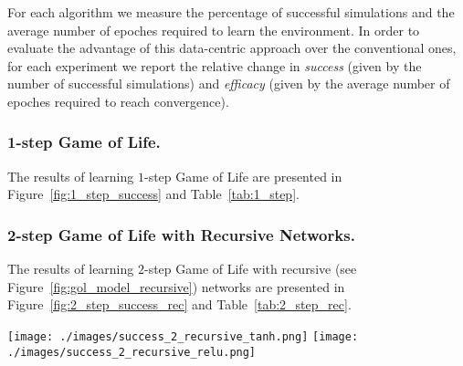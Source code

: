 \documentclass[letterpaper]{article} %
\begin{document}
For each algorithm we measure the percentage of successful simulations and the average number of epoches required to learn the environment.
In order to evaluate the advantage of this data-centric approach over the conventional ones, for each experiment we report the relative change in \textit{success} (given by the number of successful simulations) and \textit{efficacy} (given by the average number of epoches required to reach convergence).


\subsubsection{1-step Game of Life.}
The results of learning $1$-step Game of Life are presented in Figure~\ref{fig:1_step_success} and Table~\ref{tab:1_step}.


\subsubsection{2-step Game of Life with Recursive Networks.}
The results of learning $2$-step Game of Life with recursive (see Figure~\ref{fig:gol_model_recursive}) networks are presented in Figure~\ref{fig:2_step_success_rec} and Table~\ref{tab:2_step_rec}.

\begin{figure*}[t]
    \centering
    \texttt{[image: ./images/success\_2\_recursive\_tanh.png]}
    \texttt{[image: ./images/success\_2\_recursive\_relu.png]}
    \caption{Success rates on 2-step Game of Life with recursive networks with Tanh (left) / ReLU (right) activations.}
    \label{fig:2_step_success_rec}
\end{figure*}
\end{document}
